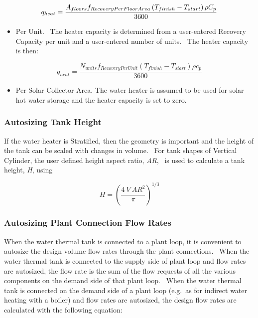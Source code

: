 \begin{equation}
  q_{heat} = \frac{A_{floors}f_{RecoveryPerFloorArea}\left(T_{finish} - T_{start}\right)\rho C_p}{3600}
\end{equation}

\begin{itemize}
\item Per Unit.~ The heater capacity is determined from a user-entered Recovery Capacity per unit and a user-entered number of units.~ The heater capacity is then:
\end{itemize}

\begin{equation}
{q_{heat}} = \frac{{{N_{units}}{f_{RecoveryPerUnit}}({T_{finish}} - {T_{start}})\rho {c_p}}}{{3600}}
\end{equation}

\begin{itemize}
\item Per Solar Collector Area. The water heater is assumed to be used for solar hot water storage and the heater capacity is set to zero.
\end{itemize}

\subsubsection{Autosizing Tank Height}\label{autosizing-tank-height}

If the water heater is Stratified, then the geometry is important and the height of the tank can be scaled with changes in volume.~ For tank shapes of Vertical Cylinder, the user defined height aspect ratio, \emph{AR},~ is used to calculate a tank height, \emph{H}, using

\begin{equation}
H = {\left( {\frac{{4~V~A{R^2}}}{\pi }} \right)^{1/3}}
\end{equation}

\subsubsection{Autosizing Plant Connection Flow Rates}\label{autosizing-plant-connection-flow-rates}

When the water thermal tank is connected to a plant loop, it is convenient to autosize the design volume flow rates through the plant connections.~ When the water thermal tank is connected to the supply side of plant loop and flow rates are autosized, the flow rate is the sum of the flow requests of all the various components on the demand side of that plant loop.~ When the water thermal tank is connected on the demand side of a plant loop (e.g.~as for indirect water heating with a boiler) and flow rates are autosized, the design flow rates are calculated with the following equation:

